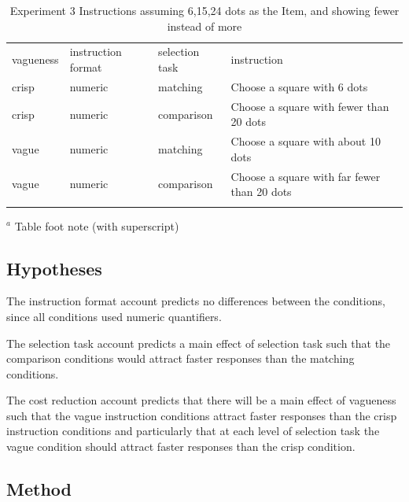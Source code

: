 \documentclass[graybox,envcountchap,sectrefs%
,footinfo
]{svmono}
\begin{document}
\begin{table}
\caption{Experiment 3 Instructions assuming 6,15,24 dots as the Item, and showing fewer instead of more}
\label{instructionse3} 
\begin{tabular}{llll}
\hline\noalign{\smallskip}
vagueness&instruction format&selection task&instruction\\
\noalign{\smallskip}\svhline\noalign{\smallskip}
crisp 	& numeric		&matching 	& Choose a square with 6 dots \\ 
crisp 	& numeric		&comparison 	& Choose a square with fewer than 20 dots \\
vague 	& numeric		&matching 	& Choose a square with about 10 dots \\ 
vague 	& numeric		&comparison 	& Choose a square with far fewer than 20 dots \\ 
\noalign{\smallskip}\hline\noalign{\smallskip}
\end{tabular}
$^a$ Table foot note (with superscript)\\
\end{table}

\subsection{Hypotheses}

The instruction format account predicts no differences between the conditions, since all conditions used numeric quantifiers.

The selection task account predicts a main effect of selection task such that the comparison conditions would attract faster responses than the matching conditions.

The cost reduction account predicts that there will be a main effect of vagueness such that the vague instruction conditions attract faster responses than the crisp instruction conditions and particularly that at each level of selection task the vague condition should attract faster responses than the crisp condition.


\subsection{Method}
\end{document}
